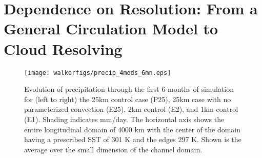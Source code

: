 \documentclass[draft]{agujournal2019}
\begin{document}
\section{Dependence on Resolution: From a General Circulation Model to Cloud Resolving}

\begin{figure}
  \texttt{[image: walkerfigs/precip\_4mods\_6mn.eps]}
  \caption{Evolution of precipitation through the first 6 months of simulation for (left to right) the 25km control case (P25), 
  25km case with no parameterized convection (E25), 2km control (E2), and 1km control (E1).  
  Shading indicates mm/day.  The horizontal axis shows the entire 
  longitudinal domain of 4000 km with the center of the domain having a prescribed SST of 301 K and the edges 297 K.  
  Shown is the average over the small dimension of the channel domain. } 
  \label{fig:hov_4mods_6mn}
\end{figure}

\end{document}
